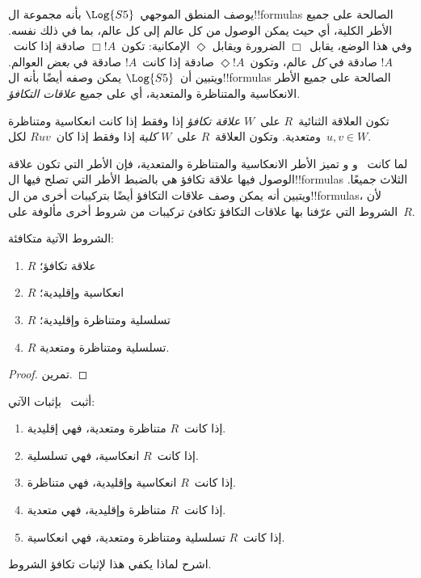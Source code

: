 \documentclass[../../../include/open-logic-section]{subfiles}
\begin{document}


يوصف المنطق الموجهي~$\Log{S5}$ بأنه مجموعة ال!!{formula}s الصالحة
على جميع الأطر الكلية، أي حيث يمكن الوصول من كل عالم إلى كل عالم،
بما في ذلك نفسه. وفي هذا الوضع، يقابل~$\Box$ الضرورة ويقابل
$\Diamond$ الإمكانية: تكون~$\Box !A$ صادقة إذا كانت~$!A$ صادقة في
\emph{كل} عالم، وتكون~$\Diamond !A$ صادقة إذا كانت~$!A$ صادقة في
\emph{بعض} العوالم. ويتبين أن~$\Log{S5}$ يمكن وصفه أيضًا بأنه
ال!!{formula}s الصالحة على جميع الأطر الانعكاسية والمتناظرة والمتعدية،
أي على جميع \emph{علاقات التكافؤ}.

\begin{defn}
  تكون العلاقة الثنائية~$R$ على~$W$ \emph{علاقة تكافؤ} إذا وفقط إذا
  كانت انعكاسية ومتناظرة ومتعدية. وتكون العلاقة~$R$ على~$W$
  \emph{كلية} إذا وفقط إذا كان~$Ruv$ لكل~$u,v \in W$.
\end{defn}

لما كانت~ و و تميز الأطر الانعكاسية والمتناظرة
والمتعدية، فإن الأطر التي تكون علاقة الوصول فيها علاقة تكافؤ هي
بالضبط الأطر التي تصلح فيها ال!!{formula}s الثلاث جميعًا. ويتبين أنه
يمكن وصف علاقات التكافؤ أيضًا بتركيبات أخرى من ال!!{formula}s، لأن
الشروط التي عرّفنا بها علاقات التكافؤ تكافئ تركيبات من شروط أخرى
مألوفة على~$R$.

\begin{prop}
  الشروط الآتية متكافئة:
  \begin{enumerate}
  \item $R$ علاقة تكافؤ؛
  \item $R$ انعكاسية وإقليدية؛
  \item $R$ تسلسلية ومتناظرة وإقليدية؛
  \item $R$ تسلسلية ومتناظرة ومتعدية.
  \end{enumerate}
\end{prop}

\begin{proof}
  تمرين.
\end{proof}

\begin{prob}
  أثبت~ بإثبات الآتي:
  \begin{enumerate}
  \item إذا كانت~$R$ متناظرة ومتعدية، فهي إقليدية.
  \item إذا كانت~$R$ انعكاسية، فهي تسلسلية.
  \item إذا كانت~$R$ انعكاسية وإقليدية، فهي متناظرة.
  \item إذا كانت~$R$ متناظرة وإقليدية، فهي متعدية.
  \item إذا كانت~$R$ تسلسلية ومتناظرة ومتعدية، فهي انعكاسية.
  \end{enumerate}
  اشرح لماذا يكفي هذا لإثبات تكافؤ الشروط.
\end{prob}
\end{document}
